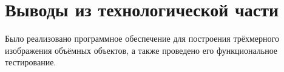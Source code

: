 \section{Выводы из технологической части}

Было реализовано программное обеспечение для построения трёхмерного изображения объёмных объектов, а также проведено его функциональное тестирование. 

\clearpage
